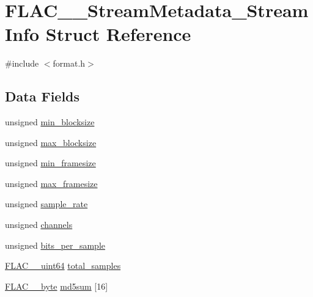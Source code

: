 \hypertarget{struct_f_l_a_c_____stream_metadata___stream_info}{}\section{F\+L\+A\+C\+\_\+\+\_\+\+Stream\+Metadata\+\_\+\+Stream\+Info Struct Reference}
\label{struct_f_l_a_c_____stream_metadata___stream_info}


{\ttfamily \#include $<$format.\+h$>$}

\subsection*{Data Fields}
\begin{DoxyCompactItemize}
\item 
unsigned \hyperlink{struct_f_l_a_c_____stream_metadata___stream_info_ad999bb6f695206464df8d76126812572}{min\+\_\+blocksize}
\item 
unsigned \hyperlink{struct_f_l_a_c_____stream_metadata___stream_info_a0eda0a30574e0b51716f34c6a90912dc}{max\+\_\+blocksize}
\item 
unsigned \hyperlink{struct_f_l_a_c_____stream_metadata___stream_info_a4f9408c082ef8bb4f14a8da6e8e24fd4}{min\+\_\+framesize}
\item 
unsigned \hyperlink{struct_f_l_a_c_____stream_metadata___stream_info_a89e04506e5030310582fed83b9a36022}{max\+\_\+framesize}
\item 
unsigned \hyperlink{struct_f_l_a_c_____stream_metadata___stream_info_a127c95ed9ea6564191f57a1642e27c97}{sample\+\_\+rate}
\item 
unsigned \hyperlink{struct_f_l_a_c_____stream_metadata___stream_info_a13bf6f8e5bdaa2dff48c29c7aff4ef88}{channels}
\item 
unsigned \hyperlink{struct_f_l_a_c_____stream_metadata___stream_info_af8886c928641f6dcc242652adf4e1bc9}{bits\+\_\+per\+\_\+sample}
\item 
\hyperlink{ordinals_8h_aa78c8c70a3eb8a58af7436f278acde8e}{F\+L\+A\+C\+\_\+\+\_\+uint64} \hyperlink{struct_f_l_a_c_____stream_metadata___stream_info_a23d6f6769cb9bbf052a3a4f592f2e383}{total\+\_\+samples}
\item 
\hyperlink{ordinals_8h_a5eb569b12d5b047cdacada4d57924ee3}{F\+L\+A\+C\+\_\+\+\_\+byte} \hyperlink{struct_f_l_a_c_____stream_metadata___stream_info_ac9cd72dc89ed697f78e8521fb69d232f}{md5sum} \mbox{[}16\mbox{]}
\end{DoxyCompactItemize}


